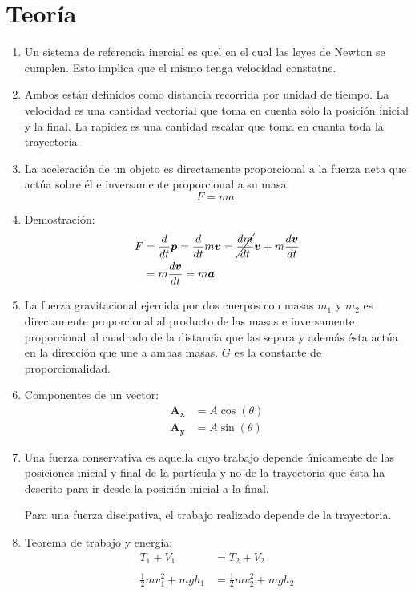 \documentclass[]{article}
\begin{document}
\section*{Teor\'ia} %
\label{sec:teoria2}
\begin{enumerate}

\item Un sistema de referencia inercial es quel en el cual las leyes de Newton
se cumplen. Esto implica que el mismo tenga velocidad constatne.

\item Ambos est\'an definidos como distancia recorrida por unidad de tiempo. La
velocidad es una cantidad vectorial que toma en cuenta s\'olo la posici\'on
inicial y la final. La rapidez es una cantidad escalar que toma en cuanta toda
la trayectoria.

\item La aceleración de un objeto es directamente proporcional a la fuerza neta que actúa sobre él e inversamente proporcional a su masa:
\begin{equation*}
F=ma.
\end{equation*}

\item Demostraci\'on:
\begin{align*}
F &=\frac{d}{dt}\boldsymbol{p} = \frac{d}{dt} m \boldsymbol{v} = 
\cancel{\frac{dm}{dt}} \boldsymbol{v} + m \frac{d\boldsymbol{v}}{dt} \\
  &=m \frac{d\boldsymbol{v}}{dt} = m \boldsymbol{a}
\end{align*}

\item La fuerza gravitacional ejercida por dos cuerpos con masas $m_{1}$ y
$m_{2}$ es directamente proporcional al producto de las masas e inversamente
proporcional al cuadrado de la distancia que las separa y adem\'as \'esta
act\'ua en la direcci\'on que une a ambas masas. $G$ es la constante de
proporcionalidad.

\item Componentes de un vector:
\begin{align*}
\boldsymbol{A_{x}} &= A\cos(\theta) \\
\boldsymbol{A_{y}} &= A\sin(\theta)
\end{align*}

\item Una fuerza conservativa es aquella cuyo trabajo depende \'unicamente de
las posiciones inicial y final de la part\'icula y no de la trayectoria que
\'esta ha descrito para ir desde la posici\'on inicial a la final. 

Para una fuerza discipativa, el trabajo realizado depende de la trayectoria.

\item Teorema de trabajo y energ\'ia:
\begin{align*}
T_{1} + V_{1} &= T_{2} + V_{2}  \\ \nonumber \\
\frac{1}{2}mv^{2}_{1} + mgh_{1} &= \frac{1}{2}mv^{2}_{2} + mgh_{2}
\end{align*}

\end{enumerate}
\end{document}
